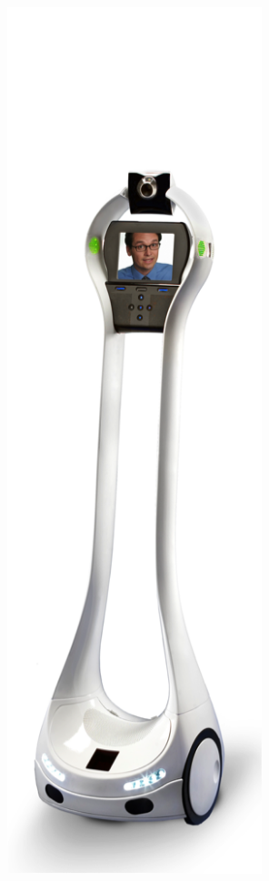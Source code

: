 \begin{figure}[ht]
   \begin{minipage}[t]{.25\linewidth} 
      \centering 
    \includegraphics[width=0.66\textwidth]{bilder/grundlagen/1.png} 

\end{minipage}
\end{figure}
